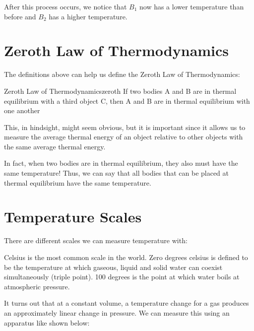 \documentclass{report}
\begin{document}
After this process occurs, we notice that $B_1$ now has a lower temperature than before and $B_2$ has a higher temperature.




\section{Zeroth Law of Thermodynamics}

The definitions above can help us define the Zeroth Law of Thermodynamics:

\begin{mytheo}{Zeroth Law of Thermodynamics}{zeroth}
	If two bodies A and B are in thermal equilibrium with a third object C, then A and B are in thermal equilibrium with one another 
\end{mytheo}

This, in hindsight, might seem obvious, but it is important since it allows us to measure the average thermal energy of an object relative to other objects with the same average thermal energy.

In fact, when two bodies are in thermal equilibrium, they also must have the same temperature! Thus, we can say that all bodies that can be placed at thermal equilibrium have the same temperature.



\section{Temperature Scales}
There are different scales we can measure temperature with:

Celsius is the most common scale in the world. Zero degrees celsius is defined to be the temperature at which gaseous, liquid and solid water can coexist simultaneously (triple point). 100 degrees is the point at which water boils at atmospheric pressure.

It turns out that at a constant volume, a temperature change for a gas produces an approximately linear change in pressure. We can measure this using an apparatus like shown below:
\end{document}
